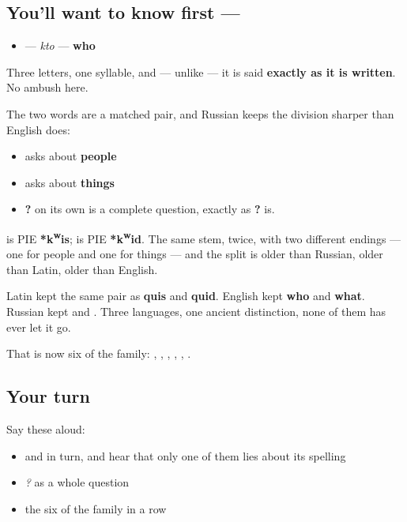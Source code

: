 \subsection*{You'll want to know first — }
\begin{itemize}
\raggedright
  \item \textbf{} — \emph{kto} — \textbf{who}
\end{itemize}

Three letters, one syllable, and — unlike \textbf{} — it is said \textbf{exactly as it is written}. No \textbf{} ambush here.

The two words are a matched pair, and Russian keeps the division sharper than English does:

\begin{itemize}
\raggedright
  \item \textbf{} asks about \textbf{people}
  \item \textbf{} asks about \textbf{things}
\end{itemize}

\begin{itemize}
\raggedright
  \item \textbf{?} on its own is a complete question, exactly as \textbf{?} is.
\end{itemize}

\begin{cousinweb}
\textbf{} is PIE \textbf{*k\textsuperscript{w}is}; \textbf{} is PIE \textbf{*k\textsuperscript{w}id}. The same stem, twice, with two different endings — one for people and one for things — and the split is older than Russian, older than Latin, older than English.

Latin kept the same pair as \textbf{quis} and \textbf{quid}. English kept \textbf{who} and \textbf{what}. Russian kept \textbf{} and \textbf{}. Three languages, one ancient distinction, none of them has ever let it go.

That is now six of the family: \textbf{}, \textbf{}, \textbf{}, \textbf{}, \textbf{}, \textbf{}.
\end{cousinweb}

\subsection*{Your turn}
Say these aloud:

\begin{itemize}
\raggedright
  \item \emph{} and \emph{} in turn, and hear that only one of them lies about its spelling
  \item \emph{?} as a whole question
  \item the six of the family in a row
\end{itemize}

